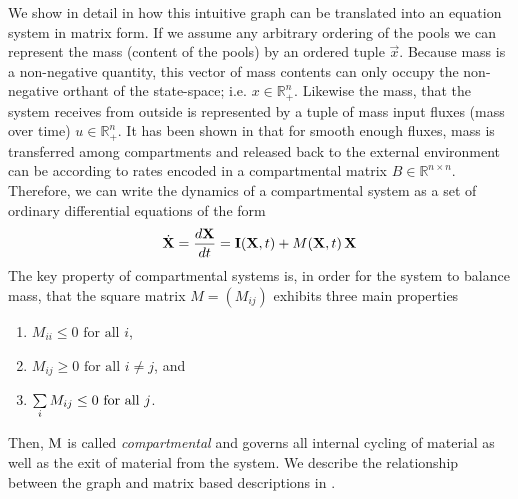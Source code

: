 We show in detail in  how this intuitive graph can be translated into an equation system in matrix form. 
If we assume any arbitrary ordering of the pools we can represent the mass (content of the pools)
by an ordered tuple $\vec{x}$.
Because mass is a non-negative quantity, this vector of mass contents can
only occupy the non-negative orthant of the state-space; i.e. $x \in
\mathbb{R}^n_+$. 
Likewise the mass, that the system receives from outside is represented
by a tuple of mass input fluxes (mass over time) $u \in \mathbb{R}^n_+$.
It has been shown in \cite{Jacquez1993SIAM}
that for smooth enough fluxes, mass is transferred among compartments and released back to the external
environment can be according to rates encoded in a compartmental matrix $B \in
\mathbb{R}^{n \times n}$. 
Therefore, we can write the dynamics of a
compartmental system as a set of ordinary differential equations of the form
\begin{equation} \label{eq:CompartmentalSystem}
\dot{\mathbf{X}} = \frac{d\mathbf{X}}{dt} = \mathbf{I}(\mathbf{X}, t) + M(\mathbf{X}, t) \, \mathbf{X}
\end{equation}
The key property of compartmental systems is, in order for the system to balance mass, that the square matrix $M=(M_{ij})$ exhibits three main properties
\begin{enumerate}
  \item $M_{ii}\leq0\text{ for all }i$,
  \item $M_{ij}\geq0\text{ for all }i\neq j$, and
  \item $\sum\limits_i M_{ij}\leq 0\text{ for all }j$.
\end{enumerate}
Then, $\mathrm{M}$ is called \emph{compartmental} and governs all internal cycling of material as well as the exit of material from the system.
We describe the relationship between the graph and matrix based descriptions in .

